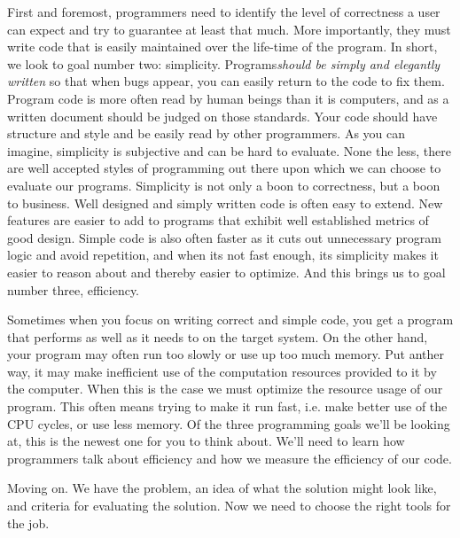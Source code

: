 \documentclass[]{tufte-handout}
\begin{document}
First and foremost, programmers need to identify the level of correctness a user can expect and try to guarantee at least that much. More importantly, they must write code that is easily maintained over the life-time of the program.  In short, we look to goal number two: simplicity.  Programs\textit{should be simply and elegantly written} so that when bugs appear, you can easily return to the code to fix them.  Program code is more often read by human beings than it is computers, and as a written document should be judged on those standards.  Your code should have structure and style and be easily read by other programmers.  As you can imagine, simplicity is subjective and can be hard to evaluate.  None the less, there are well accepted styles of programming out there upon which we can choose to evaluate our programs. Simplicity is not only a boon to correctness, but a boon to business. Well designed and simply written code is often easy to extend. New features are easier to add to programs that exhibit well established metrics of good design. Simple code is also often faster as it cuts out unnecessary program logic and avoid repetition, and when its not fast enough, its simplicity makes it easier to reason about and thereby easier to optimize. And this brings us to goal number three, efficiency.

Sometimes when you focus on writing correct and simple code, you get a program that performs as well as it needs to on the target system. On the other hand, your program may often run too slowly or use up too much memory. Put anther way, it may make inefficient use of the computation resources provided to it by the computer.  When this is the case we must optimize the resource usage of our program.  This often means trying to make it run fast, i.e. make better use of the CPU cycles, or use less memory.  Of the three programming goals we'll be looking at, this is the newest one for you to think about.  We'll need to learn how programmers talk about efficiency and how we measure the efficiency of our code. 

Moving on. We have the problem, an idea of what the solution might look like, and criteria for evaluating the solution. Now we need to choose the right tools for the job.
  
\end{document}
